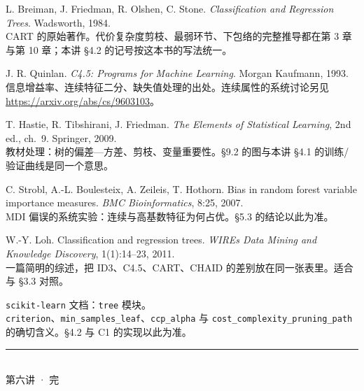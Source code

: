 \documentclass[11pt,a4paper,fontset=windows,zihao=-4]{ctexart}
\begin{document}
\begin{enumerate}[label={[\arabic*]},leftmargin=2.6em,itemsep=0.45em]
  \item L. Breiman, J. Friedman, R. Olshen, C. Stone. \emph{Classification and Regression Trees}. Wadsworth, 1984.\\[1pt]
  {\footnotesize\color{steel}CART 的原始著作。代价复杂度剪枝、最弱环节、下包络的完整推导都在第 3 章与第 10 章；本讲 §4.2 的记号按这本书的写法统一。}

  \item J. R. Quinlan. \emph{C4.5: Programs for Machine Learning}. Morgan Kaufmann, 1993.\\[1pt]
  {\footnotesize\color{steel}信息增益率、连续特征二分、缺失值处理的出处。连续属性的系统讨论另见 \url{https://arxiv.org/abs/cs/9603103}。}

  \item T. Hastie, R. Tibshirani, J. Friedman. \emph{The Elements of Statistical Learning}, 2nd ed., ch.~9. Springer, 2009.\\[1pt]
  {\footnotesize\color{steel}教材处理：树的偏差—方差、剪枝、变量重要性。§9.2 的图与本讲 §4.1 的训练/验证曲线是同一个意思。}

  \item C. Strobl, A.-L. Boulesteix, A. Zeileis, T. Hothorn. Bias in random forest variable importance measures. \emph{BMC Bioinformatics}, 8:25, 2007.\\[1pt]
  {\footnotesize\color{steel}MDI 偏误的系统实验：连续与高基数特征为何占优。§5.3 的结论以此为准。}

  \item W.-Y. Loh. Classification and regression trees. \emph{WIREs Data Mining and Knowledge Discovery}, 1(1):14--23, 2011.\\[1pt]
  {\footnotesize\color{steel}一篇简明的综述，把 ID3、C4.5、CART、CHAID 的差别放在同一张表里。适合与 §3.3 对照。}

  \item \texttt{scikit-learn} 文档：\texttt{tree} 模块。\\[1pt]
  {\footnotesize\color{steel}\texttt{criterion}、\texttt{min\_samples\_leaf}、\texttt{ccp\_alpha} 与 \texttt{cost\_complexity\_}\allowbreak\texttt{pruning\_path} 的确切含义。§4.2 与 C1 的实现以此为准。}
\end{enumerate}

\vspace{1.0em}
\begin{flushright}
{\color{navy!25}\rule{3.2cm}{0.5pt}}\\[5pt]
{\footnotesize\color{steel}第六讲 · 完}
\end{flushright}
\end{document}

